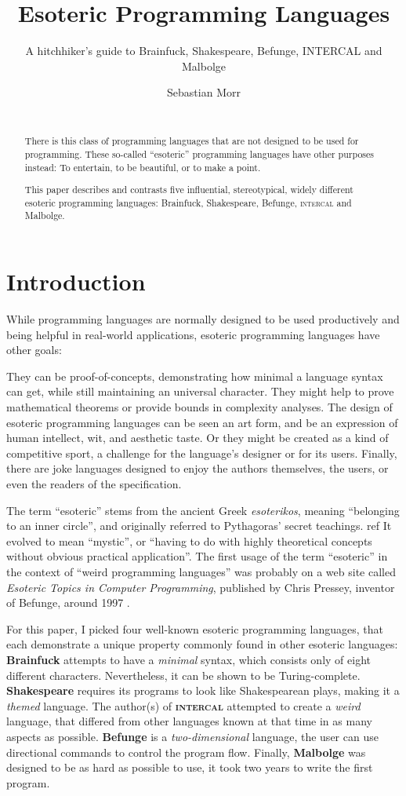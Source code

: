 \documentclass{sig-alternate}
\title{Esoteric Programming Languages}
\subtitle{A hitchhiker's guide to Brainfuck, Shakespeare, Befunge, INTERCAL and Malbolge}
\author{\alignauthor Sebastian Morr\\\affaddr{Technical University Braunschweig}\\\email{sebastian@morr.cc}}
\newcommand{\ic}{\textsc{intercal}}
\begin{document}
\maketitle

\begin{abstract}
    There is this class of programming languages that are not designed to be used for programming. These so-called “esoteric” programming languages have other purposes instead: To entertain, to be beautiful, or to make a point.

    This paper describes and contrasts five influential, stereotypical, widely different esoteric programming languages: Brainfuck, Shakespeare, Befunge, \ic{} and Malbolge.
\end{abstract}

\section{Introduction}

While programming languages are normally designed to be used productively and being helpful in real-world applications, esoteric programming languages have other goals:

They can be proof-of-concepts, demonstrating how minimal a language syntax can get, while still maintaining an universal character. They might help to prove mathematical theorems or provide bounds in complexity analyses. The design of esoteric programming languages can be seen an art form, and be an expression of human intellect, wit, and aesthetic taste. Or they might be created as a kind of competitive sport, a challenge for the language's designer or for its users. Finally, there are joke languages designed to enjoy the authors themselves, the users, or even the readers of the specification.

The term “esoteric” stems from the ancient Greek \emph{esoterikos}, meaning “belonging to an inner circle”, and originally referred to Pythagoras' secret teachings. ref It evolved to mean “mystic”, or “having to do with highly theoretical concepts without obvious practical application”. The first usage of the term “esoteric” in the context of “weird programming languages” was probably on a web site called \emph{Esoteric Topics in Computer Programming}, published by Chris Pressey, inventor of Befunge, around 1997 \cite{pressey2005chris}.

For this paper, I picked four well-known esoteric programming languages, that each demonstrate a unique property commonly found in other esoteric languages: \textbf{Brainfuck} attempts to have a \textit{minimal} syntax, which consists only of eight different characters. Nevertheless, it can be shown to be Turing-complete. \textbf{Shakespeare} requires its programs to look like Shakespearean plays, making it a \textit{themed} language. The author(s) of \textbf{\ic{}} attempted to create a \textit{weird} language, that differed from other languages known at that time in as many aspects as possible. \textbf{Befunge} is a \textit{two-dimensional} language, the user can use directional commands to control the program flow. Finally, \textbf{Malbolge} was designed to be as hard as possible to use, it took two years to write the first program.
\end{document}
